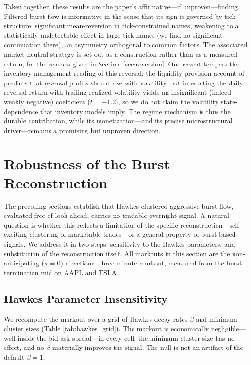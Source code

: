 \documentclass[11pt]{article}
\begin{document}
Taken together, these results are the paper's affirmative---if unproven---finding. Filtered burst flow is informative in the sense that its sign is governed by tick structure: significant mean-reversion in tick-constrained names, weakening to a statistically undetectable effect in large-tick names (we find no significant continuation there), an asymmetry orthogonal to common factors. The associated market-neutral strategy is set out as a construction rather than as a measured return, for the reasons given in Section~\ref{sec:reversion}. One caveat tempers the inventory-management reading of this reversal: the liquidity-provision account of \citet{nagel2012} predicts that reversal profits should rise with volatility, but interacting the daily reversal return with trailing realized volatility yields an insignificant (indeed weakly negative) coefficient ($t=-1.2$), so we do not claim the volatility state-dependence that inventory models imply. The regime mechanism is thus the durable contribution, while its monetization---and its precise microstructural driver---remains a promising but unproven direction.

\section{Robustness of the Burst Reconstruction}
\label{sec:reconstruction}
The preceding sections establish that Hawkes-clustered aggressive-burst flow, evaluated free of look-ahead, carries no tradable overnight signal. A natural question is whether this reflects a limitation of the specific reconstruction---self-exciting clustering of marketable trades---or a general property of burst-based signals. We address it in two steps: sensitivity to the Hawkes parameters, and substitution of the reconstruction itself. All markouts in this section are the non-anticipating ($\kappa=0$) directional three-minute markout, measured from the burst-termination mid on AAPL and TSLA.

\subsection{Hawkes Parameter Insensitivity}
We recompute the markout over a grid of Hawkes decay rates $\beta$ and minimum cluster sizes (Table \ref{tab:hawkes_grid}). The markout is economically negligible---well inside the bid-ask spread---in every cell; the minimum cluster size has no effect, and no $\beta$ materially improves the signal. The null is not an artifact of the default $\beta=1$.
\end{document}
